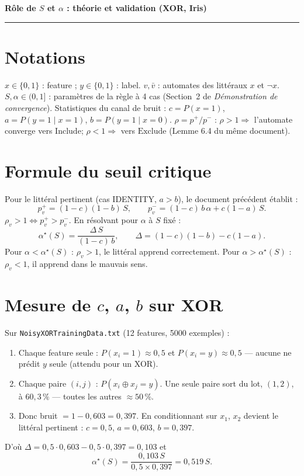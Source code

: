 \documentclass[12pt,a4paper]{article}
\theoremstyle{remark}
\newcommand{\Inc}{\ensuremath{\mathrm{Include}}}
\newcommand{\Exc}{\ensuremath{\mathrm{Exclude}}}
\newcommand{\vbar}{\bar{v}}
\begin{document}
\begin{center}
  {\LARGE\bfseries Rôle de $S$ et $\alpha$ : théorie et validation (XOR, Iris)}
\end{center}
\vspace{0.5em}
\hrule
\vspace{1.5em}

\section{Notations}

$x\in\{0,1\}$ : feature ; $y\in\{0,1\}$ : label. $v,\vbar$ : automates des
littéraux $x$ et $\neg x$. $S,\alpha\in(0,1]$ : paramètres de la règle à 4 cas
(Section~2 de \textit{Démonstration de convergence}). Statistiques du canal de
bruit : $c=P(x{=}1)$, $a=P(y{=}1\mid x{=}1)$, $b=P(y{=}1\mid x{=}0)$.
$\rho=p^+/p^-$ : $\rho>1\Rightarrow$ l'automate converge vers \Inc ;
$\rho<1\Rightarrow$ vers \Exc{} (Lemme 6.4 du même document).

\section{Formule du seuil critique}

Pour le littéral pertinent (cas IDENTITY, $a>b$), le document précédent établit :
\[
  p^+_v = (1-c)(1-b)\,S, \qquad p^-_v = (1-c)\,b\,\alpha + c(1-a)\,S.
\]
$\rho_v>1 \iff p^+_v > p^-_v$. En résolvant pour $\alpha$ à $S$ fixé :
\[
  \boxed{\alpha^\star(S) = \frac{\Delta\,S}{(1-c)\,b}, \qquad
  \Delta = (1-c)(1-b) - c(1-a).}
\]
Pour $\alpha<\alpha^\star(S)$ : $\rho_v>1$, le littéral apprend correctement.
Pour $\alpha>\alpha^\star(S)$ : $\rho_v<1$, il apprend dans le mauvais sens.

\section{Mesure de $c$, $a$, $b$ sur XOR}

Sur \texttt{NoisyXORTrainingData.txt} (12 features, 5000 exemples) :
\begin{enumerate}
  \item Chaque feature seule : $P(x_i{=}1)\approx0{,}5$ et $P(x_i{=}y)\approx0{,}5$
  --- aucune ne prédit $y$ seule (attendu pour un XOR).
  \item Chaque paire $(i,j)$ : $P(x_i\oplus x_j = y)$. Une seule paire sort du
  lot, $(1,2)$, à $60{,}3\,\%$ --- toutes les autres $\approx50\,\%$.
  \item Donc bruit $=1-0{,}603=0{,}397$. En conditionnant sur $x_1$, $x_2$
  devient le littéral pertinent : $c=0{,}5$, $a=0{,}603$, $b=0{,}397$.
\end{enumerate}
D'où $\Delta = 0{,}5\cdot0{,}603 - 0{,}5\cdot0{,}397 = 0{,}103$ et
\[
  \alpha^\star(S) = \frac{0{,}103\,S}{0{,}5\times0{,}397} = 0{,}519\,S.
\]
\end{document}
